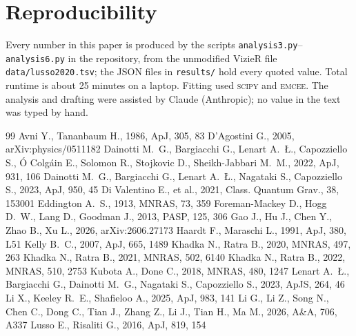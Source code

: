 \documentclass[twocolumn,10pt]{article}
\begin{document}
\section*{Reproducibility}
Every number in this paper is produced by the scripts \texttt{analysis3.py}--\texttt{analysis6.py} in the repository, from the unmodified VizieR file \texttt{data/lusso2020.tsv}; the JSON files in \texttt{results/} hold every quoted value. Total runtime is about 25 minutes on a laptop. Fitting used \textsc{scipy} and \textsc{emcee}. The analysis and drafting were assisted by Claude (Anthropic); no value in the text was typed by hand.

\begin{thebibliography}{99}\small
{} Avni Y., Tananbaum H., 1986, ApJ, 305, 83
 D'Agostini G., 2005, arXiv:physics/0511182
 Dainotti M.~G., Bargiacchi G., Lenart A.~{\L}., Capozziello S., \'O Colg\'ain E., Solomon R., Stojkovic D., Sheikh-Jabbari M.~M., 2022, ApJ, 931, 106
 Dainotti M.~G., Bargiacchi G., Lenart A.~{\L}., Nagataki S., Capozziello S., 2023, ApJ, 950, 45
 Di Valentino E., et al., 2021, Class. Quantum Grav., 38, 153001
 Eddington A.~S., 1913, MNRAS, 73, 359
 Foreman-Mackey D., Hogg D.~W., Lang D., Goodman J., 2013, PASP, 125, 306
 Gao J., Hu J., Chen Y., Zhao B., Xu L., 2026, arXiv:2606.27173
 Haardt F., Maraschi L., 1991, ApJ, 380, L51
 Kelly B.~C., 2007, ApJ, 665, 1489
 Khadka N., Ratra B., 2020, MNRAS, 497, 263
 Khadka N., Ratra B., 2021, MNRAS, 502, 6140
 Khadka N., Ratra B., 2022, MNRAS, 510, 2753
 Kubota A., Done C., 2018, MNRAS, 480, 1247
 Lenart A.~{\L}., Bargiacchi G., Dainotti M.~G., Nagataki S., Capozziello S., 2023, ApJS, 264, 46
 Li X., Keeley R.~E., Shafieloo A., 2025, ApJ, 983, 141
 Li G., Li Z., Song N., Chen C., Dong C., Tian J., Zhang Z., Li J., Tian H., Ma M., 2026, A\&A, 706, A337
 Lusso E., Risaliti G., 2016, ApJ, 819, 154

\end{thebibliography}
\end{document}

